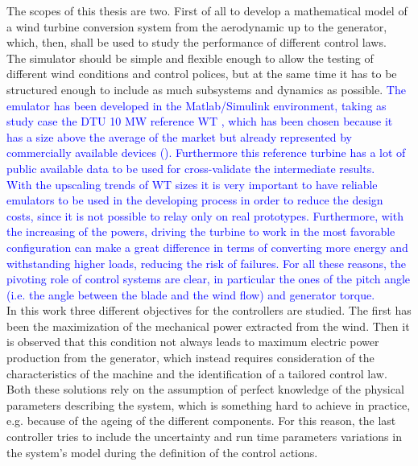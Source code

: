 The scopes of this thesis are two. First of all to develop a mathematical model of a wind turbine conversion system from the aerodynamic up to the generator, which, then, shall be used to study the performance of different control laws.\\
The simulator should be simple and flexible enough to allow the testing of different wind conditions and control polices, but at the same time it has to be structured enough to include as much subsystems and dynamics as possible. \textcolor{blue}{The emulator has been developed in the Matlab/Simulink environment, taking as study case the DTU 10 MW reference WT \cite{DTU_Wind_Energy_Report-I-0092}, which has been chosen because it has a size above the average of the market but already represented by commercially available devices (\cite{wind_europe_data_2022}). Furthermore this reference turbine has a lot of public available data to be used for cross-validate the intermediate results.\\
With the upscaling trends of WT sizes it is very important to have reliable emulators to be used in the developing process in order to reduce the design costs, since it is not possible to relay only on real prototypes. Furthermore, with the increasing of the powers, driving the turbine to work in the most favorable configuration can make a great difference in terms of converting more energy and withstanding higher loads, reducing the risk of failures. For all these reasons, the pivoting role of control systems are clear, in particular the ones of the pitch angle (i.e. the angle between the blade and the wind flow) and generator torque.}\\
 In this work three different objectives for the controllers are studied. The first has been the maximization of the mechanical power extracted from the wind. Then it is observed that this condition not always leads to maximum electric power production from the generator, which instead requires consideration of the characteristics of the machine and the identification of a tailored control law. Both these solutions rely on the assumption of perfect knowledge of the physical parameters describing the system, which is something hard to achieve in practice, e.g. because of the ageing of the different components. For this reason, the last controller tries to include the uncertainty and run time parameters variations in the system's model during the definition of the control actions.  

